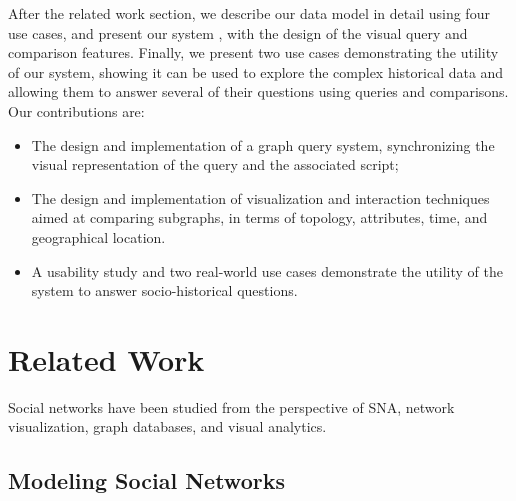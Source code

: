 
After the related work section, we describe our data model in detail using four use cases, and present our system \name, with the design of the visual query and comparison features. Finally, we present two use cases demonstrating the utility of our system, showing it can be used to explore the complex historical data and allowing them to answer several of their questions using queries and comparisons.
Our contributions are:
\begin{itemize}
    \item The design and implementation of a graph query system, synchronizing the visual representation of the query and the associated script;
    \item The design and implementation of visualization and interaction techniques aimed at comparing subgraphs, in terms of topology, attributes, time, and geographical location.
    \item A  usability study and two real-world use cases demonstrate the utility of the system to answer socio-historical questions.
\end{itemize}





\section{Related Work}

Social networks have been studied from the perspective of SNA, network visualization, graph databases, and visual analytics.

\subsection{Modeling Social Networks}

